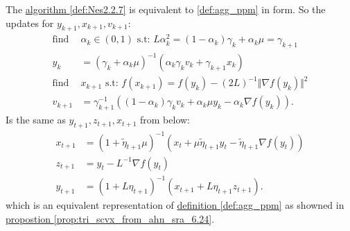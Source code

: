         \begin{proposition}
        \label{prop:Nes2.2.7_via_ahn_sra_6.24}
            The \hyperref[def:Nes2.2.7]{algorithm \ref*{def:Nes2.2.7}} is equivalent to \hyperref[def:agg_ppm]{\ref*{def:agg_ppm}} in form. 
            So the updates for $y_{k + 1}, x_{k + 1}, v_{k + 1}$: 
            \begin{align*}
                \text{find } &
                \alpha_k \in (0, 1) 
                \text{ s.t: } L\alpha_k^2 
                = (1 - \alpha_k)\gamma_k + \alpha_k \mu = \gamma_{k + 1} 
                \\
                y_k &= 
                \left(
                    \gamma_k + \alpha_k \mu
                \right)^{-1} \left(
                    \alpha_k \gamma_k v_k + \gamma_{k + 1}x_k
                \right)
                \\
                \text{find } & x_{k + 1} \text{ s.t: }
                f(x_{k + 1})
                = f(y_k) - (2L)^{-1}\Vert \nabla f(y_k)\Vert^2
                \\
                v_{k+1} &= 
                \gamma_{k + 1}^{-1} 
                \left(
                    (1 - \alpha_k) \gamma_k v_k + 
                    \alpha_k \mu y_k 
                    - \alpha_k \nabla f(y_k)
                \right). 
            \end{align*}
            Is the same as $y_{t + 1}, z_{t + 1}, x_{t + 1}$ from below: 
            \begin{align*}
                x_{t + 1} 
                & = 
                (1 + \tilde \eta_{t + 1}\mu)^{-1}
                (x_t + \mu\tilde \eta_{t + 1}y_t - \tilde \eta_{t + 1}\nabla f(y_t))
                \\
                z_{t + 1} &= y_t - L^{-1} \nabla f(y_t)
                \\
                y_{t + 1} &= 
                (1 + L\eta_{t + 1})^{-1}
                (x_{t + 1} + L \eta_{t + 1} z_{t + 1}).
            \end{align*}
            which is an equivalent representation of \hyperref[def:agg_ppm]{definition \ref*{def:agg_ppm}} as showned in \hyperref[prop:tri_scvx_from_ahn_sra_6.24]{propostion \ref*{prop:tri_scvx_from_ahn_sra_6.24}}. 
        \end{proposition}
